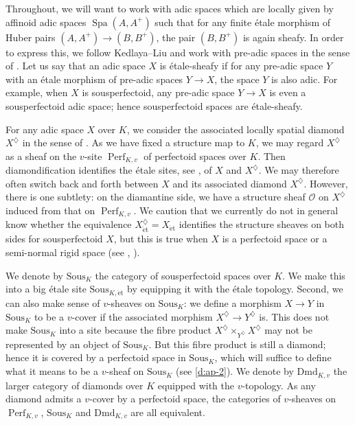 \documentclass[11pt]{amsart}
\numberwithin{equation}{section}
\theoremstyle{definition}
\theoremstyle{remark}
\renewcommand{\O}{\mathcal{O}}
\newcommand{\Perf}{\operatorname{Perf}}
\newcommand{\Spa}{\operatorname{Spa}}
\newcommand{\et}{{\operatorname{\acute{e}t}}}
\newcommand{\Sous}{\mathrm{Sous}}
\begin{document}
Throughout, we will want to work with adic spaces which are locally given by affinoid adic spaces $\Spa(A,A^+)$ such that for any finite \'etale morphism of Huber pairs $(A,A^+)\to (B,B^+)$, the pair $(B,B^+)$ is again sheafy. In order to express this, we follow Kedlaya--Liu and work with pre-adic spaces in the sense of \cite[Definition~8.2.3]{KedlayaLiu-rel-p-p-adic-Hodge-I}. Let us say that an adic space $X$ is \'etale-sheafy if for any pre-adic space $Y$ with an \'etale morphism of pre-adic spaces $Y\to X$, the space $Y$ is also adic.
For example, when $X$ is sousperfectoid, any pre-adic space $Y\to X$ is even a sousperfectoid adic space; hence sousperfectoid spaces are \'etale-sheafy. 

For any adic space $X$ over $K$, we consider the associated locally spatial diamond $X^\diamondsuit$ in the sense of \cite[Section~15]{etale-cohomology-of-diamonds}.
  As we have fixed a structure map to $K$, we may regard $X^\diamondsuit$ as a sheaf on the $v$-site $\Perf_{K,v}$ of perfectoid spaces over $K$. Then diamondification identifies the \'etale sites, see \cite[Lemma 15.6]{etale-cohomology-of-diamonds}, of $X$ and $X^\diamondsuit$. We may therefore often switch back and forth between $X$ and its associated diamond $X^\diamondsuit$. However,  there is one subtlety: on the diamantine side, we have a structure sheaf $\O$ on $X^\diamondsuit$ induced from that on $\Perf_{K,v}$.  We caution that we currently do not in general know whether the equivalence $X^\diamondsuit_\et=X_\et$ identifies the structure sheaves on both sides for sousperfectoid $X$, but this is true when $X$ is a perfectoid space or a semi-normal rigid space (see \cite[Theorem 8.7]{etale-cohomology-of-diamonds}, \cite[Proposition 10.2.3]{ScholzeBerkeleyLectureNotes}).

  We denote by $\Sous_{K}$  the category of sousperfectoid spaces over $K$.  We make this into a big \'etale site $\Sous_{K,\et}$ by equipping it with the \'etale topology. Second, we can also make sense of $v$-sheaves on $\Sous_{K}$: we define a morphism $X\to Y$ in $\Sous_{K}$ to be a $v$-cover if the associated morphism $X^\diamondsuit\to Y^\diamondsuit$ is. This does not make $\Sous_{K}$ into a site because the fibre product $X^\diamondsuit\times_{Y^\diamondsuit}X^\diamondsuit$ may not be represented by an object of $\Sous_{K}$. But this fibre product is still a diamond; hence it is covered by a perfectoid space in $\Sous_{K}$, which will suffice to define what it means to be a $v$-sheaf on $\Sous_{K}$ (see \eqref{d:ap-2}). We denote by $\mathrm{Dmd}_{K,v}$ the larger category of diamonds over $K$ equipped with the $v$-topology. As any diamond admits a $v$-cover by a perfectoid space, the categories of $v$-sheaves on $\Perf_{K,v}$, $\Sous_{K}$ and $\mathrm{Dmd}_{K,v}$ are all equivalent.
\end{document}
